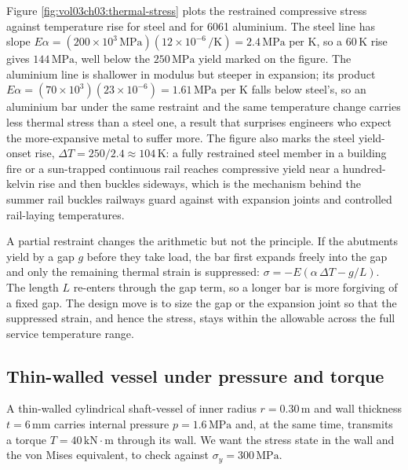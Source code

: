 

Figure \ref{fig:vol03ch03:thermal-stress} plots the restrained
compressive stress against temperature rise for steel and for 6061
aluminium. The steel line has slope $E\alpha = (200\times 10^3\,\text{
MPa})(12\times 10^{-6}\,\si{\per\kelvin}) = 2.4\,\text{MPa per K}$, so a
$60\,\text{K}$ rise gives $144\,\text{MPa}$, well below the $250\,\text{
MPa}$ yield marked on the figure. The aluminium line is shallower in
modulus but steeper in expansion; its product $E\alpha = (70\times
10^3)(23\times 10^{-6}) = 1.61\,\text{MPa per K}$ falls below steel's,
so an aluminium bar under the same restraint and the same temperature
change carries less thermal stress than a steel one, a result that
surprises engineers who expect the more-expansive metal to suffer more.
The figure also marks the steel yield-onset rise, $\Delta T = 250/2.4
\approx 104\,\text{K}$: a fully restrained steel member in a building
fire or a sun-trapped continuous rail reaches compressive yield near a
hundred-kelvin rise and then buckles sideways, which is the mechanism
behind the summer rail buckles railways guard against with expansion
joints and controlled rail-laying temperatures.

A partial restraint changes the arithmetic but not the principle. If
the abutments yield by a gap $g$ before they take load, the bar first
expands freely into the gap and only the remaining thermal strain is
suppressed: $\sigma = -E(\alpha\,\Delta T - g/L)$. The length $L$
re-enters through the gap term, so a longer bar is more forgiving of a
fixed gap. The design move is to size the gap or the expansion joint so
that the suppressed strain, and hence the stress, stays within the
allowable across the full service temperature range.

\subsection{Thin-walled vessel under pressure and torque}

A thin-walled cylindrical shaft-vessel of inner radius $r = 0.30\,\si{
\meter}$ and wall thickness $t = 6\,\si{\milli\meter}$ carries internal
pressure $p = 1.6\,\text{MPa}$ and, at the same time, transmits a
torque $T = 40\,\text{kN}\cdot\text{m}$ through its wall. We want the
stress state in the wall and the von Mises equivalent, to check against
$\sigma_y = 300\,\text{MPa}$.

